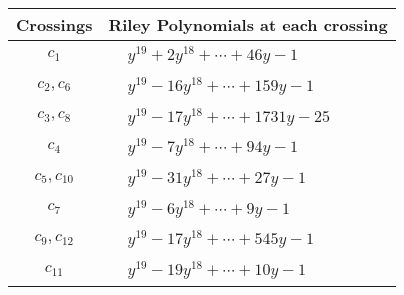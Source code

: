 \documentclass[1p]{elsarticle_modified}
\theoremstyle{definition}
\begin{document}
\begin{tabular}{m{50pt}|m{274pt}}
Crossings & \hspace{64pt}Riley Polynomials at each crossing \\
\hline $$\begin{aligned}c_{1}\end{aligned}$$&$\begin{aligned}
&y^{19}+2 y^{18}+\cdots+46 y-1
\end{aligned}$\\
\hline $$\begin{aligned}c_{2},c_{6}\end{aligned}$$&$\begin{aligned}
&y^{19}-16 y^{18}+\cdots+159 y-1
\end{aligned}$\\
\hline $$\begin{aligned}c_{3},c_{8}\end{aligned}$$&$\begin{aligned}
&y^{19}-17 y^{18}+\cdots+1731 y-25
\end{aligned}$\\
\hline $$\begin{aligned}c_{4}\end{aligned}$$&$\begin{aligned}
&y^{19}-7 y^{18}+\cdots+94 y-1
\end{aligned}$\\
\hline $$\begin{aligned}c_{5},c_{10}\end{aligned}$$&$\begin{aligned}
&y^{19}-31 y^{18}+\cdots+27 y-1
\end{aligned}$\\
\hline $$\begin{aligned}c_{7}\end{aligned}$$&$\begin{aligned}
&y^{19}-6 y^{18}+\cdots+9 y-1
\end{aligned}$\\
\hline $$\begin{aligned}c_{9},c_{12}\end{aligned}$$&$\begin{aligned}
&y^{19}-17 y^{18}+\cdots+545 y-1
\end{aligned}$\\
\hline $$\begin{aligned}c_{11}\end{aligned}$$&$\begin{aligned}
&y^{19}-19 y^{18}+\cdots+10 y-1
\end{aligned}$\\
\hline
\end{tabular}\\~\\
\end{document}
